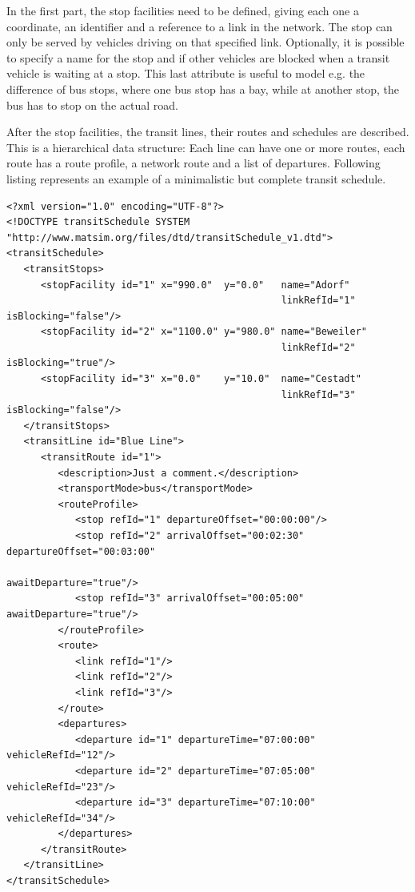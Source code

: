In the first part, the stop facilities need to be defined, giving each one a coordinate, an identifier and a reference to a link in the network. The stop can only be served by vehicles driving on that specified link. Optionally, it is possible to specify a name for the stop and if other vehicles are blocked when a transit vehicle is waiting at a stop. This last attribute is useful to model e.g. the difference of bus stops, where one bus stop has a bay, while at another stop, the bus has to stop on the actual road.

After the stop facilities, the transit lines, their routes and schedules are described. This is a hierarchical data structure: Each line can have one or more routes, each route has a route profile, a network route and a list of departures. Following listing represents an example of a minimalistic but complete transit schedule.

\begin{lstlisting}
<?xml version="1.0" encoding="UTF-8"?> 
<!DOCTYPE transitSchedule SYSTEM "http://www.matsim.org/files/dtd/transitSchedule_v1.dtd"> 
<transitSchedule> 
   <transitStops> 
      <stopFacility id="1" x="990.0"  y="0.0"   name="Adorf" 
                                                linkRefId="1" isBlocking="false"/> 
      <stopFacility id="2" x="1100.0" y="980.0" name="Beweiler" 
                                                linkRefId="2" isBlocking="true"/> 
      <stopFacility id="3" x="0.0"    y="10.0"  name="Cestadt" 
                                                linkRefId="3" isBlocking="false"/> 
   </transitStops> 
   <transitLine id="Blue Line"> 
      <transitRoute id="1"> 
         <description>Just a comment.</description> 
         <transportMode>bus</transportMode> 
         <routeProfile> 
            <stop refId="1" departureOffset="00:00:00"/> 
            <stop refId="2" arrivalOffset="00:02:30" departureOffset="00:03:00" 
                                                     awaitDeparture="true"/> 
            <stop refId="3" arrivalOffset="00:05:00" awaitDeparture="true"/> 
         </routeProfile> 
         <route> 
            <link refId="1"/> 
            <link refId="2"/> 
            <link refId="3"/> 
         </route> 
         <departures> 
            <departure id="1" departureTime="07:00:00" vehicleRefId="12"/> 
            <departure id="2" departureTime="07:05:00" vehicleRefId="23"/> 
            <departure id="3" departureTime="07:10:00" vehicleRefId="34"/> 
         </departures> 
      </transitRoute> 
   </transitLine> 
</transitSchedule>
\end{lstlisting}

